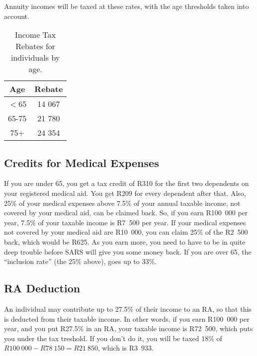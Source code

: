 \documentclass[a4paper, justified]{tufte-handout}
\begin{document}
Annuity incomes will be taxed at these rates, with the age thresholds taken into account.

\begin{table}[]
	\centering
	\caption{Income Tax Rebates for individuals by age.}
	\label{tab:rebates}
	\begin{tabular}{cc}
		\toprule
		\textbf{Age}           & \textbf{Rebate} \\
		\midrule
		$<$65 & 14 067 \\
		65-75         & 21 780 \\
		75+           & 24 354\\
		\bottomrule
	\end{tabular}
\end{table}

\subsection{Credits for Medical Expenses}
If you are under 65, you get a tax credit of R310 for the first two dependents on your registered medical aid. You get R209 for every dependent after that. Also, 25\% of your medical expenses above 7.5\% of your annual taxable income, not covered by your medical aid, can be claimed back. So, if you earn R100~000 per year, 7.5\% of your taxable income is R7~500 per year. If your  medical expenses not covered by your medical aid are R10~000, you can claim 25\% of the R2~500 back, which would be R625. As you earn more, you need to have to be in quite deep trouble before SARS will give you some money back.
If you are over 65, the ``inclusion rate'' (the 25\% above), goes up to 33\%.

\subsection{RA Deduction}
An individual may contribute up to 27.5\% of their income to an RA, so that this is deducted from their taxable income. In other words, if you earn R100~000 per year, and you put R27.5\% in an RA, your taxable income is R72~500, which puts you under the tax treshold. If you don't do it, you will be taxed 18\% of $R100~000-R78~150 = R21~850$, which is R3~933.
\end{document}
